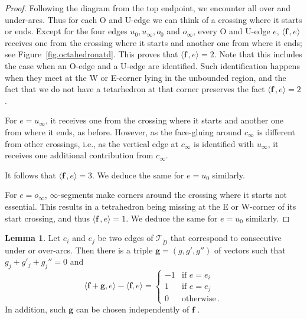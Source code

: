 \documentclass[12pt,reqno]{amsart}
\theoremstyle{definition}
\newtheorem{lemma}[theorem]{Lemma}
\def\calT{\mathcal T}
\renewcommand{\Ddot}{\mathring{D}}
\begin{document}
\begin{proof}
Following the diagram from the top endpoint, we encounter all over and under-arcs.
Thus for each O and U-edge we can think of a crossing where it starts or ends.
Except for the four edges $u_0,u_\infty, o_0$ and $o_\infty$, every O and U-edge
$e$, $\langle \boldsymbol f \, , e \rangle$ receives one from the crossing where it
starts and another one from where it ends; see Figure~\ref{fig.octahedronatd}. This
proves that $\langle \boldsymbol f \, , e \rangle=2$. Note that this includes the
case when an O-edge and a U-edge are identified. Such identification happens when
they meet at the W or E-corner lying in the unbounded region, and the fact that we
do not have a tetarhedron at that corner preserves the fact
$\langle \boldsymbol f \, , e \rangle=2$.

For $e = u_\infty$,  it receives one from the crossing where it starts and another
one from where it ends, as before. However, as the face-gluing around $c_\infty$ is
different from other crossings, i.e., as the vertical edge at $c_\infty$ is identified
with $u_\infty$, it receives one additional contribution from $c_\infty$.

It follows that $\langle \boldsymbol f \, , e \rangle=3$. We deduce the same for
$e=u_0$ similarly.
	
For $e = o_\infty$, $\infty$-segments make corners around the crossing where  it starts
not essential. This results in a tetrahedron being missing at the E or W-corner of its
start crossing, and thus $ \langle \boldsymbol f \, , e \rangle =1 $. We deduce the
same for $e =u_0$ similarly.
\end{proof}

\begin{lemma}
\label{lem.overunder}
Let $e_i$ and $e_j$ be two edges of $\calT_{\Ddot}$ that correspond to consecutive under
or over-arcs. Then there is a triple $\boldsymbol g=(g,g', g'')$ of vectors such
that $g_j + g'_j + g_j''=0$ and
\begin{equation*}
\langle {\boldsymbol f + \boldsymbol g} ,  e \rangle -\langle {\boldsymbol f}, e \rangle
=\begin{cases}
-1 & \textrm{if } e = e_i \\
1 & \textrm{if } e = e_j \\
0 & \textrm{otherwise}\, .
\end{cases}
\end{equation*}
In addition, such $\boldsymbol g$ can be chosen independently of $\boldsymbol f$ .
\end{lemma}
\end{document}
